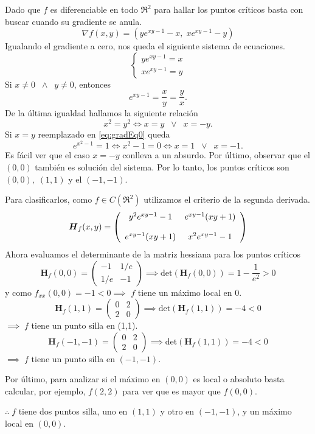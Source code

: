 \begin{solution}
Dado que $f$ es diferenciable en todo $\Re^{2}$    para hallar los puntos cr\'iticos  basta con buscar cuando su  gradiente se anula.
 \[
     \nabla f(x,y)= \left( ye^{xy-1}-x,\; xe^{xy-1}-y \right)
 \]
   Igualando el gradiente a cero, nos queda el siguiente sistema de ecuaciones.
    \[
    \begin{cases}
        ye^{xy-1}=x \\
        xe^{xy-1}=y
    \end{cases}
    \]
    Si $x\neq0 \;\;\land\;\; y\neq0$, entonces
    \begin{equation}
        e^{xy-1}=\frac{x}{y}=\frac{y}{x}. \label{eq:gradEq0}
    \end{equation}
    De la última igualdad hallamos la siguiente relación  $$  x^2=y^2 \iff x=y \;\;\lor\;\; x=-y.$$
  Si  $x=y$ reemplazado en  \eqref{eq:gradEq0} queda
    $$  e^{x^2-1}=1  \iff  x^2-1=0 \iff x=1 \;\;\lor\;\; x=-1.$$
Es f\'acil ver que el caso  $x=-y$  conlleva a un absurdo.   Por \'ultimo, observar que  el $(0,0)$  también es solución del sistema.  Por lo tanto, los puntos críticos son $(0,0),\;(1,1)$ y el $(-1,-1)$.

    Para clasificarlos,  como $f \in C(\Re^{2})$ utilizamos el criterio de la segunda derivada.
    \[
        \setlength{\abovedisplayskip}{0.5cm}
        \setlength{\belowdisplayskip}{0.5cm}
         \boldsymbol{H}_f(x,y) = \left(\begin{array}{cc}
         y^2e^{xy-1}-1 & e^{xy-1}(xy+1) \\[.4cm]
         e^{xy-1}(xy+1) & x^2e^{xy-1}-1
         \end{array}\right)
    \]
 Ahora evaluamos el determinante de la matriz hessiana para los puntos críticos
    \[
        \boldsymbol{H}_f(0,0) = \left(\begin{array}{cc}
         -1 & 1/e\\
         1/e & -1
         \end{array}\right)
         \implies \text{det} \left( \boldsymbol{H}_f(0,0) \right)  = 1 - \frac{1}{e^2} > 0
    \]
    y como $f_{xx}(0,0)=-1<0 \implies$ $f$ tiene un máximo local en 0. 
    \[
        \boldsymbol{H}_f(1,1) = \left(\begin{array}{cc}
         0 & 2\\
         2 & 0
         \end{array}\right)
         \implies \text{det} \left( \boldsymbol{H}_f(1,1) \right)  = -4 < 0
    \]
    $\implies \;f$ tiene un punto silla en (1,1).
    \[
        \boldsymbol{H}_f(-1,-1) = \left(\begin{array}{cc}
         0 & 2\\
         2 & 0
         \end{array}\right)
         \implies \text{det} \left( \boldsymbol{H}_f(1,1) \right)  = -4 < 0
    \]
    $\implies \;f$ tiene un punto silla en $(-1,-1)$.

    Por último, para analizar si el máximo en $(0,0)$ es local o absoluto basta calcular, por ejemplo, $f(2,2)$ para ver que es mayor que $f(0,0)$.

    $\therefore\;f$ tiene dos puntos silla, uno en $(1,1)$ y otro en $(-1,-1)$, y un máximo local en $(0,0)$.
    
\end{solution}

